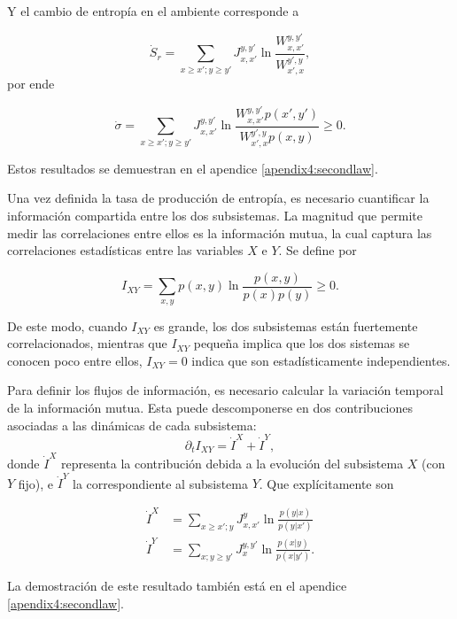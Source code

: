 Y el cambio de entropía en el ambiente corresponde a

\begin{equation*}
    \dot{S}_{r} = \sum_{x\geq x'; y\geq y'} J_{x,x'}^{y,y'} \ln \frac{W_{x,x'}^{y,y'}}{W_{x',x}^{y',y}},
\end{equation*}
por ende

\begin{equation*}
    \dot{\sigma} = \sum_{x\geq x'; y\geq y'} J_{x,x'}^{y,y'} \ln \frac{ W_{x,x'}^{y,y'}p(x',y')  }{ W_{x',x}^{y',y}p(x,y) } \geq 0.
\end{equation*}

Estos resultados se demuestran en el apendice \ref{apendix4:secondlaw}.  

Una vez definida la tasa de producción de entropía, es necesario cuantificar la información compartida entre los dos subsistemas. La magnitud que permite medir las correlaciones entre ellos es la información mutua, la cual captura las correlaciones estadísticas entre las variables \( X \) e \( Y \). Se define por

\begin{equation*}
    I_{XY} = \sum_{x,y} p(x,y) \ln \frac{p(x,y)}{p(x)p(y)} \geq 0. 
\end{equation*}

De este modo, cuando \( I_{XY} \) es grande, los dos subsistemas están fuertemente correlacionados, mientras que $I_{XY}$ pequeña implica que los dos sistemas se conocen poco entre ellos, \( I_{XY} = 0 \) indica que son estadísticamente independientes.

Para definir los flujos de información, es necesario calcular la variación temporal de la información mutua. Esta puede descomponerse en dos contribuciones asociadas a las dinámicas de cada subsistema:
\[
\partial_t I_{XY} = \dot{I}^{X} + \dot{I}^{Y},
\]
donde \( \dot{I}^{X} \) representa la contribución debida a la evolución del subsistema \( X \) (con \( Y \) fijo), e \( \dot{I}^{Y} \) la correspondiente al subsistema \( Y \). Que explícitamente son

\begin{align*}
    \dot{I}^{X} & = \sum_{x\geq x'; y}J_{x,x'}^{y} \ln \frac{ p(y|x) }{p(y|x')} \\
    \dot{I}^{Y} & = \sum_{x;y\geq y'} J_{x}^{y,y'} \ln \frac{p(x|y)}{ p(x|y') }.
\end{align*}

 La demostración de este resultado también está en el apendice \ref{apendix4:secondlaw}.

